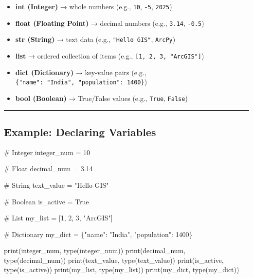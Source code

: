 \documentclass[
  11pt,
  letterpaper,
]{book}
\newenvironment{Shaded}{\begin{snugshade}}{\end{snugshade}}
\newcommand{\BuiltInTok}[1]{\textcolor[rgb]{0.00,0.23,0.31}{#1}}
\newcommand{\CommentTok}[1]{\textcolor[rgb]{0.37,0.37,0.37}{#1}}
\newcommand{\DecValTok}[1]{\textcolor[rgb]{0.68,0.00,0.00}{#1}}
\newcommand{\FloatTok}[1]{\textcolor[rgb]{0.68,0.00,0.00}{#1}}
\newcommand{\NormalTok}[1]{\textcolor[rgb]{0.00,0.23,0.31}{#1}}
\newcommand{\OperatorTok}[1]{\textcolor[rgb]{0.37,0.37,0.37}{#1}}
\newcommand{\StringTok}[1]{\textcolor[rgb]{0.13,0.47,0.30}{#1}}
\newcommand{\VariableTok}[1]{\textcolor[rgb]{0.07,0.07,0.07}{#1}}
\providecommand{\tightlist}{%
  \setlength{\itemsep}{0pt}\setlength{\parskip}{0pt}}
\begin{document}
\begin{itemize}
\tightlist
\item
  \textbf{int (Integer)} → whole numbers (e.g., \texttt{10},
  \texttt{-5}, \texttt{2025})\\
\item
  \textbf{float (Floating Point)} → decimal numbers (e.g.,
  \texttt{3.14}, \texttt{-0.5})\\
\item
  \textbf{str (String)} → text data (e.g., \texttt{"Hello\ GIS"},
  \texttt{\textquotesingle{}ArcPy\textquotesingle{}})\\
\item
  \textbf{list} → ordered collection of items (e.g.,
  \texttt{{[}1,\ 2,\ 3,\ "ArcGIS"{]}})
\item
  \textbf{dict (Dictionary)} → key-value pairs (e.g.,
  \texttt{\{"name":\ "India",\ "population":\ 1400\}})
\item
  \textbf{bool (Boolean)} → True/False values (e.g., \texttt{True},
  \texttt{False})
\end{itemize}

\begin{center}\rule{0.5\linewidth}{0.5pt}\end{center}

\subsection{Example: Declaring
Variables}\label{example-declaring-variables}

\begin{Shaded}
\begin{Highlighting}[]
\CommentTok{\# Integer}
\NormalTok{integer\_num }\OperatorTok{=} \DecValTok{10}

\CommentTok{\# Float}
\NormalTok{decimal\_num }\OperatorTok{=} \FloatTok{3.14}

\CommentTok{\# String}
\NormalTok{text\_value }\OperatorTok{=} \StringTok{"Hello GIS"}

\CommentTok{\# Boolean}
\NormalTok{is\_active }\OperatorTok{=} \VariableTok{True}

\CommentTok{\# List}
\NormalTok{my\_list }\OperatorTok{=}\NormalTok{ [}\DecValTok{1}\NormalTok{, }\DecValTok{2}\NormalTok{, }\DecValTok{3}\NormalTok{, }\StringTok{"ArcGIS"}\NormalTok{]}

\CommentTok{\# Dictionary}
\NormalTok{my\_dict }\OperatorTok{=}\NormalTok{ \{}\StringTok{"name"}\NormalTok{: }\StringTok{"India"}\NormalTok{, }\StringTok{"population"}\NormalTok{: }\DecValTok{1400}\NormalTok{\}}

\BuiltInTok{print}\NormalTok{(integer\_num, }\BuiltInTok{type}\NormalTok{(integer\_num))}
\BuiltInTok{print}\NormalTok{(decimal\_num, }\BuiltInTok{type}\NormalTok{(decimal\_num))}
\BuiltInTok{print}\NormalTok{(text\_value, }\BuiltInTok{type}\NormalTok{(text\_value))}
\BuiltInTok{print}\NormalTok{(is\_active, }\BuiltInTok{type}\NormalTok{(is\_active))}
\BuiltInTok{print}\NormalTok{(my\_list, }\BuiltInTok{type}\NormalTok{(my\_list))}
\BuiltInTok{print}\NormalTok{(my\_dict, }\BuiltInTok{type}\NormalTok{(my\_dict))}
\end{Highlighting}
\end{Shaded}
\end{document}
